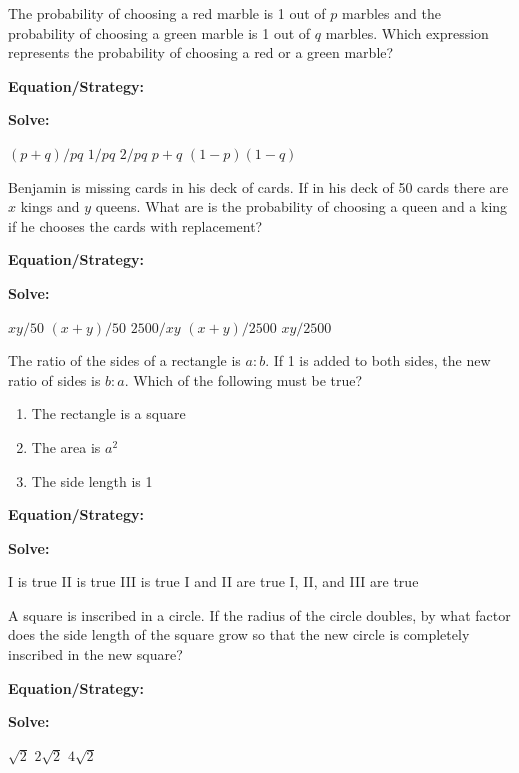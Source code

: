 \vfill
\newpage
\begin{multicols*}{2}
\begin{outline}[enumerate]
\medium

\1 The probability of choosing a red marble is 1 out of $p$ marbles and the probability of choosing a green marble is 1 out of $q$ marbles. Which expression represents the probability of choosing a red or a green marble?

\bigskip
\textbf{Equation/Strategy:} \hrulefill

\bigskip
\textbf{Solve:}

\vfill
\2 $(p+q)/pq$
\2 $1/pq$
\2 $2/pq$
\2 $p+q$
\2 $(1-p)(1-q)$

\midline

\1 Benjamin is missing cards in his deck of cards. If in his deck of 50 cards there are $x$ kings and $y$ queens. What are is the probability of choosing a queen and a king if he chooses the cards with replacement?

\bigskip
\textbf{Equation/Strategy:} \hrulefill

\bigskip
\textbf{Solve:}

\vfill
\2 $xy/50$
\2 $(x+y)/50$
\2 $2500/xy$
\2 $(x+y)/2500$
\2 $xy/2500$

\columnbreak
\advanced

\1 The ratio of the sides of a rectangle is $a:b$. If 1 is added to both sides, the new ratio of sides is $b:a$. Which of the following must be true?

\begin{enumerate}[label=\Roman*.]
\item The rectangle is a square
\item The area is $a^2$
\item The side length is 1
\end{enumerate}

\bigskip
\textbf{Equation/Strategy:} \hrulefill

\bigskip
\textbf{Solve:}

\vfill
\2 I is true
\2 II is true
\2 III is true
\2 I and II are true
\2 I, II, and III are true

\midline

\1 A square is inscribed in a circle. If the radius of the circle doubles, by what factor does the side length of the square grow so that the new circle is completely inscribed in the new square?

\bigskip
\textbf{Equation/Strategy:} \hrulefill

\bigskip
\textbf{Solve:}

\vfill
{}
\2 $\sqrt2$
\2 $2\sqrt2$
\2 $4\sqrt2$
\end{outline}
\end{multicols*}